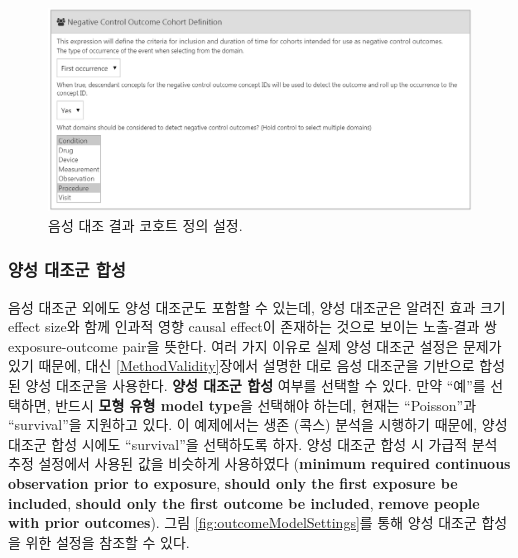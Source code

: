 \documentclass[10.5pt]{book}
\theoremstyle{definition}
\theoremstyle{definition}
\theoremstyle{definition}
\theoremstyle{remark}
\begin{document}
\begin{figure}

{\centering \includegraphics[width=1\linewidth]{images/PopulationLevelEstimation/ncSettings} 

}

\caption{음성 대조 결과 코호트 정의 설정.}\label{fig:ncSettings}
\end{figure}

\subsubsection*{양성 대조군 합성}\label{--}

음성 대조군 외에도 양성 대조군도 포함할 수 있는데, 양성 대조군은 알려진
효과 크기 effect size와 함께 인과적 영향 causal effect이 존재하는 것으로
보이는 노출-결과 쌍 exposure-outcome pair을 뜻한다. 여러 가지 이유로
실제 양성 대조군 설정은 문제가 있기 때문에, 대신
\ref{MethodValidity}장에서 설명한 대로 음성 대조군을 기반으로 합성된
양성 대조군을 사용한다. \textbf{양성 대조군 합성} 여부를 선택할 수 있다.
만약 ``예''를 선택하면, 반드시 \textbf{모형 유형 model type}을 선택해야
하는데, 현재는 ``Poisson''과 ``survival''을 지원하고 있다. 이 예제에서는
생존 (콕스) 분석을 시행하기 때문에, 양성 대조군 합성 시에도
``survival''을 선택하도록 하자. 양성 대조군 합성 시 가급적 분석 추정
설정에서 사용된 값을 비슷하게 사용하였다 (\textbf{minimum required
continuous observation prior to exposure}, \textbf{should only the first
exposure be included}, \textbf{should only the first outcome be
included}, \textbf{remove people with prior outcomes}). 그림
\ref{fig:outcomeModelSettings}를 통해 양성 대조군 합성을 위한 설정을
참조할 수 있다.
\end{document}
